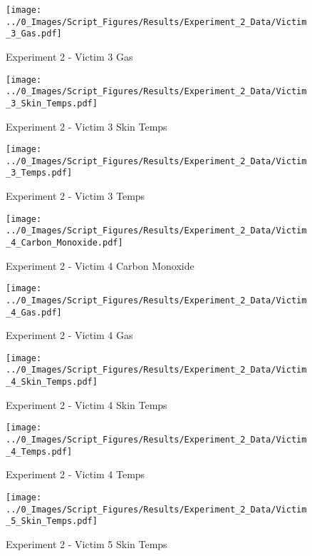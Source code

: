 	\clearpage

	\begin{figure}[H]
		\centering
		\texttt{[image: ../0\_Images/Script\_Figures/Results/Experiment\_2\_Data/Victim\_3\_Gas.pdf]}
		\caption[]{Experiment 2 - Victim 3 Gas}
	\end{figure}
 

	\begin{figure}[H]
		\centering
		\texttt{[image: ../0\_Images/Script\_Figures/Results/Experiment\_2\_Data/Victim\_3\_Skin\_Temps.pdf]}
		\caption[]{Experiment 2 - Victim 3 Skin Temps}
	\end{figure}
 
	\clearpage

	\begin{figure}[H]
		\centering
		\texttt{[image: ../0\_Images/Script\_Figures/Results/Experiment\_2\_Data/Victim\_3\_Temps.pdf]}
		\caption[]{Experiment 2 - Victim 3 Temps}
	\end{figure}
 

	\begin{figure}[H]
		\centering
		\texttt{[image: ../0\_Images/Script\_Figures/Results/Experiment\_2\_Data/Victim\_4\_Carbon\_Monoxide.pdf]}
		\caption[]{Experiment 2 - Victim 4 Carbon Monoxide}
	\end{figure}
 
	\clearpage

	\begin{figure}[H]
		\centering
		\texttt{[image: ../0\_Images/Script\_Figures/Results/Experiment\_2\_Data/Victim\_4\_Gas.pdf]}
		\caption[]{Experiment 2 - Victim 4 Gas}
	\end{figure}
 

	\begin{figure}[H]
		\centering
		\texttt{[image: ../0\_Images/Script\_Figures/Results/Experiment\_2\_Data/Victim\_4\_Skin\_Temps.pdf]}
		\caption[]{Experiment 2 - Victim 4 Skin Temps}
	\end{figure}
 
	\clearpage

	\begin{figure}[H]
		\centering
		\texttt{[image: ../0\_Images/Script\_Figures/Results/Experiment\_2\_Data/Victim\_4\_Temps.pdf]}
		\caption[]{Experiment 2 - Victim 4 Temps}
	\end{figure}
 

	\begin{figure}[H]
		\centering
		\texttt{[image: ../0\_Images/Script\_Figures/Results/Experiment\_2\_Data/Victim\_5\_Skin\_Temps.pdf]}
		\caption[]{Experiment 2 - Victim 5 Skin Temps}
	\end{figure}
 
